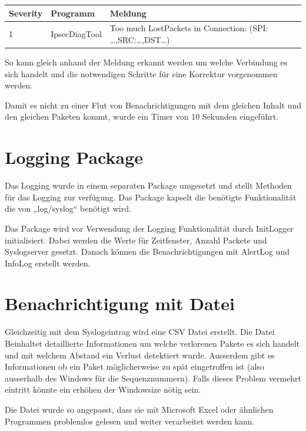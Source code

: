 \begin{tabular}{|p{0.5in}|p{0.7in}|p{3.0in}|} \hline 
Severity & Programm & Meldung \\ \hline 
1 & IpsecDiagTool & Too much LostPackets in Connection: (SPI: \dots ,SRC:\dots ,DST\dots ) \\ \hline 
\end{tabular}



\noindent So kann gleich anhand der Meldung erkannt werden um welche Verbindung es sich handelt und die notwendigen Schritte für eine Korrektur vorgenommen werden.

\noindent Damit es nicht zu einer Flut von Benachrichtigungen mit dem gleichen Inhalt und den gleichen Paketen kommt, wurde ein Timer von 10 Sekunden eingeführt.


\section{ Logging Package}

\noindent Das Logging wurde in einem separaten Package umgesetzt und stellt Methoden für das Logging zur verfügung. Das Package kapselt die benötigte Funktionalität die von „log/syslog`` benötigt wird.

\noindent Das Package wird vor Verwendung der Logging Funktionalität durch InitLogger initialisiert. Dabei werden die Werte für Zeitfenster, Anzahl Packete und Syslogserver gesetzt. Danach können die Benachrichtigungen mit AlertLog und InfoLog erstellt werden.

\noindent 


\section{ Benachrichtigung mit Datei}

\noindent Gleichzeitig mit dem Syslogeintrag wird eine CSV Datei erstellt. Die Datei Beinhaltet detaillierte Informationen um welche verlorenen Pakete es sich handelt und mit welchem Abstand ein Verlust detektiert wurde. Ausserdem gibt es Informationen ob ein Paket möglicherweise zu spät eingetroffen ist (also ausserhalb des Windows für die Sequenznummern). Falls dieses Problem vermehrt eintritt könnte ein erhöhen der Windowsize nötig sein.

\noindent Die Datei wurde so angepasst, dass sie mit Microsoft Excel oder ähnlichen Programmen problemlos gelesen und weiter verarbeitet werden kann.

